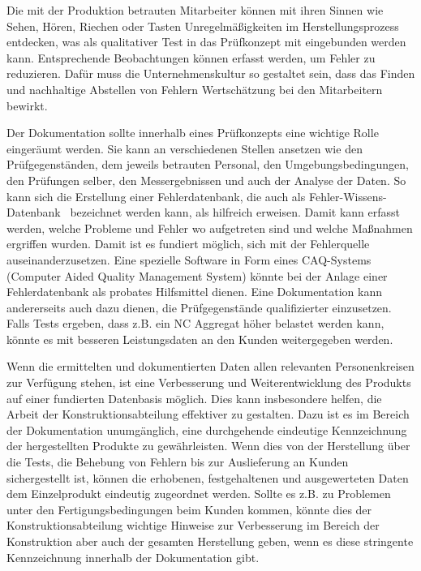 Die mit der Produktion betrauten Mitarbeiter können mit ihren Sinnen wie Sehen, Hören, Riechen oder Tasten Unregelmäßigkeiten im Herstellungsprozess entdecken, was als qualitativer Test in das Prüfkonzept mit eingebunden werden kann. Entsprechende Beobachtungen können erfasst werden, um Fehler zu reduzieren. Dafür muss die Unternehmenskultur so gestaltet sein, dass das Finden und nachhaltige Abstellen von Fehlern Wertschätzung bei den Mitarbeitern bewirkt.


Der Dokumentation sollte innerhalb eines Prüfkonzepts eine wichtige Rolle eingeräumt werden. Sie kann an verschiedenen Stellen ansetzen wie den Prüfgegenständen, dem jeweils betrauten Personal, den Umgebungsbedingungen, den Prüfungen selber, den Messergebnissen und auch der Analyse der Daten. So kann sich die Erstellung einer Fehlerdatenbank, die auch als Fehler-Wissens-Datenbank~\cite{Riebschlaeger2006} bezeichnet werden kann, als hilfreich erweisen. Damit kann erfasst werden, welche Probleme und Fehler wo aufgetreten sind und welche Maßnahmen ergriffen wurden. Damit ist es fundiert möglich, sich mit der Fehlerquelle auseinanderzusetzen. Eine spezielle Software in Form eines CAQ-Systems (Computer Aided Quality Management System) könnte bei der Anlage einer Fehlerdatenbank als probates Hilfsmittel dienen. Eine Dokumentation kann andererseits auch dazu dienen, die Prüfgegenstände qualifizierter einzusetzen. Falls Tests ergeben, dass z.B. ein NC Aggregat höher belastet werden kann, könnte es mit besseren Leistungsdaten an den Kunden weitergegeben werden. 


Wenn die ermittelten und dokumentierten Daten allen relevanten Personenkreisen zur Verfügung stehen, ist eine Verbesserung und Weiterentwicklung des Produkts auf einer fundierten Datenbasis möglich. Dies kann insbesondere helfen, die Arbeit der Konstruktionsabteilung effektiver zu gestalten. Dazu ist es im Bereich der Dokumentation unumgänglich, eine durchgehende eindeutige Kennzeichnung der hergestellten Produkte zu gewährleisten. Wenn dies von der Herstellung über die Tests, die Behebung von Fehlern bis zur Auslieferung an Kunden sichergestellt ist, können die erhobenen, festgehaltenen und ausgewerteten Daten dem Einzelprodukt eindeutig zugeordnet werden. Sollte es z.B. zu Problemen unter den Fertigungsbedingungen beim Kunden kommen, könnte dies der Konstruktionsabteilung wichtige Hinweise zur Verbesserung im Bereich der Konstruktion aber auch der gesamten Herstellung geben, wenn es diese stringente Kennzeichnung innerhalb der Dokumentation gibt.


